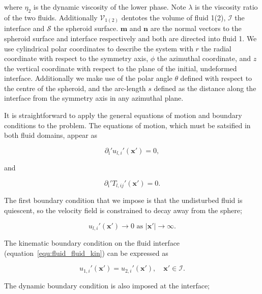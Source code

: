 \documentclass[12pt]{article}
\begin{document}
where $\eta_{2}$ is the dynamic viscosity of the lower phase. Note $\lambda$ is the viscosity ratio of the two fluids. Additionally $\mathcal{V}_{1(2)}$ dentotes the volume of fluid 1(2), $\mathcal{I}$ the interface and $\mathcal{S}$ the spheroid surface. $\boldsymbol{m}$ and $\boldsymbol{n}$ are the normal vectors to the spheroid surface and interface respectively and both are directed into fluid 1. We use cylindrical polar coordinates to describe the system with $r$ the radial coordinate with respect to the symmetry axis, $\phi$ the azimuthal coordinate, and $z$ the vertical coordinate with respect to the plane of the initial, undeformed interface. Additionally we make use of the polar angle $\theta$ defined with respect to the centre of the spheroid, and the arc-length $s$ defined as the distance along the interface from the symmetry axis in any azimuthal plane.

It is straightforward to apply the general equations of motion and boundary conditions to the problem. The equations of motion, which must be satsified in both fluid domains, appear as 

\begin{equation}
\label{equ:cont}
\partial_{\text{i}}' u_{l,i}'(\boldsymbol{x'}) = 0,
\end{equation}

and 

\begin{equation}
\label{equ:prob_stokes}
\partial_{\text{i}}' T_{l,ij}'(\boldsymbol{x'}) = 0.
\end{equation}

The first boundary condition that we impose is that the undisturbed fluid is quiescent, so the velocity field is constrained to decay away from the sphere;

\begin{equation}
\label{equ:BC_inf}
u_{l, i}'(\boldsymbol{x'}) \to 0 \text{ as } |\boldsymbol{x'}| \to \infty.
\end{equation}

The kinematic boundary condition on the fluid interface (equation~\ref{equ:fluid_fluid_kin}) can be expressed as  

\begin{equation}
\label{equ:BC_kin_int_nodim}
u_{1,i}'(\boldsymbol{x'}) = u_{2,i}'(\boldsymbol{x'}), \quad \boldsymbol{x'} \in \mathcal{I}.
\end{equation}

The dynamic boundary condition is also imposed at the interface;
\end{document}
